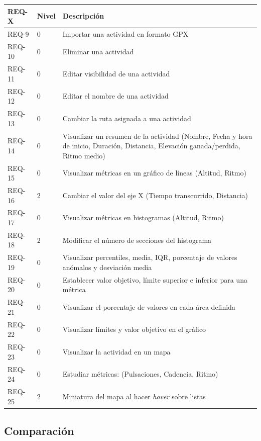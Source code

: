 \begin{longtable}{p{2cm} p{1cm} p{11cm}}
\toprule
\textbf{REQ-X} & \textbf{Nivel} & \textbf{Descripción} \\
\midrule
\endhead

REQ-9 & 0 & Importar una actividad en formato GPX \\
REQ-10 & 0 & Eliminar una actividad \\
REQ-11 & 0 & Editar visibilidad de una actividad \\
REQ-12 & 0 & Editar el nombre de una actividad \\
REQ-13 & 0 & Cambiar la ruta asignada a una actividad \\
REQ-14 & 0 & Visualizar un resumen de la actividad (Nombre, Fecha y hora de inicio, Duración, Distancia, Elevación ganada/perdida, Ritmo medio) \\
REQ-15 & 0 & Visualizar métricas en un gráfico de líneas (Altitud, Ritmo) \\
REQ-16 & 2 & Cambiar el valor del eje X (Tiempo transcurrido, Distancia) \\
REQ-17 & 0 & Visualizar métricas en histogramas (Altitud, Ritmo) \\
REQ-18 & 2 & Modificar el número de secciones del histograma \\
REQ-19 & 0 & Visualizar percentiles, media, IQR, porcentaje de valores anómalos y desviación media \\
REQ-20 & 0 & Establecer valor objetivo, límite superior e inferior para una métrica \\
REQ-21 & 0 & Visualizar el porcentaje de valores en cada área definida \\
REQ-22 & 0 & Visualizar límites y valor objetivo en el gráfico \\
REQ-23 & 0 & Visualizar la actividad en un mapa \\
REQ-24 & 0 & Estudiar métricas:
(Pulsaciones, Cadencia, Ritmo) \\
REQ-25 & 2 & Miniatura del mapa al hacer \textit{hover} sobre listas \\

\bottomrule
\end{longtable}

\subsection{Comparación}

